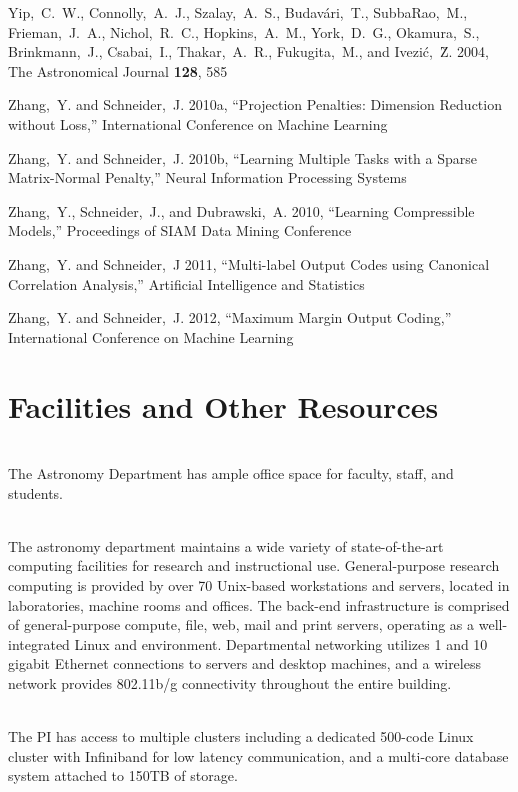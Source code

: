 \documentclass[prd,nofootbib,floatfix,11pt,tightenlines]{revtex4}
\begin{document}
\begin{thebibliography}{99}
Yip,~C.~W., Connolly,~A.~J., Szalay,~A.~S., Budav\'ari,~T., SubbaRao,~M.,
Frieman,~J.~A., Nichol,~R.~C., Hopkins,~A.~M., York,~D.~G., Okamura,~S.,
Brinkmann,~J., Csabai,~I., Thakar,~A.~R., Fukugita,~M., 
and Ivezi\'c,~\u Z. 2004, The Astronomical Journal {\bf 128}, 585

Zhang,~Y. and Schneider,~J. 2010a, ``Projection Penalties: Dimension Reduction without
Loss,'' International Conference on Machine Learning

Zhang,~Y. and Schneider,~J. 2010b,
``Learning Multiple Tasks with a Sparse Matrix-Normal Penalty,''
Neural Information Processing Systems

Zhang,~Y., Schneider,~J., and Dubrawski,~A. 2010,
``Learning Compressible Models,'' Proceedings of SIAM Data Mining Conference

Zhang,~Y. and Schneider,~J 2011, ``Multi-label Output Codes using Canonical Correlation
Analysis,'' Artificial Intelligence and Statistics

Zhang,~Y. and Schneider,~J. 2012, ``Maximum Margin Output Coding,''
International Conference on Machine Learning


\end{thebibliography} 

\newpage

\section*{Facilities and Other Resources}

\\
The Astronomy Department has ample office
space for faculty, staff, and students. 

\\
The astronomy department maintains a wide variety of state-of-the-art
computing facilities for research and instructional use. General-purpose research computing is provided by over 70 
Unix-based workstations and servers, located in laboratories, machine rooms and offices. The
back-end infrastructure is comprised of general-purpose compute, file, web, mail and print
servers, operating as a well-integrated Linux and environment. Departmental
networking utilizes 1 and 10 gigabit Ethernet connections to servers and desktop machines, and a
wireless network provides 802.11b/g connectivity throughout the entire building.

\\
The PI has  access to multiple clusters including a dedicated 500-code Linux cluster with Infiniband for low latency
communication, and a multi-core database system attached to 150TB of
storage. 


\label{lastpage}
\end{document}
